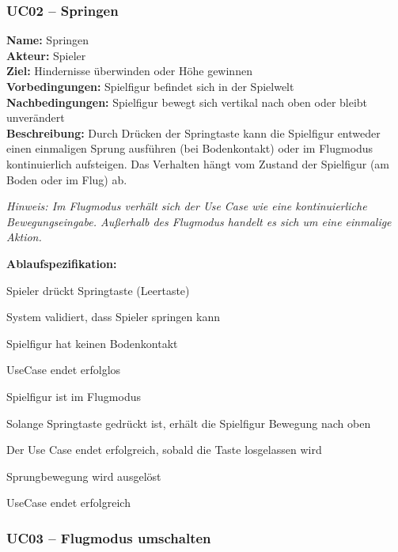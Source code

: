 \documentclass{article}
\begin{document}
\subsubsection*{UC02 – Springen}

\textbf{Name:} Springen \\
\textbf{Akteur:} Spieler \\
\textbf{Ziel:} Hindernisse überwinden oder Höhe gewinnen \\
\textbf{Vorbedingungen:} Spielfigur befindet sich in der Spielwelt \\
\textbf{Nachbedingungen:} Spielfigur bewegt sich vertikal nach oben oder bleibt unverändert \\
\textbf{Beschreibung:} Durch Drücken der Springtaste kann die Spielfigur entweder einen einmaligen Sprung ausführen (bei Bodenkontakt) oder im Flugmodus kontinuierlich aufsteigen. Das Verhalten hängt vom Zustand der Spielfigur (am Boden oder im Flug) ab.

\textit{Hinweis: Im Flugmodus verhält sich der Use Case wie eine kontinuierliche Bewegungseingabe. Außerhalb des Flugmodus handelt es sich um eine einmalige Aktion.}

\textbf{Ablaufspezifikation:}
\begin{description}[style=nextline,leftmargin=1.9cm,labelwidth=1.6cm]
  \item[1.] Spieler drückt Springtaste (Leertaste)
  \item[2.] System validiert, dass Spieler springen kann
  \item[2a.] Spielfigur hat keinen Bodenkontakt
  \item[2a.1.] UseCase endet erfolglos
  \item[2b.] Spielfigur ist im Flugmodus
  \item[2b.1.] Solange Springtaste gedrückt ist, erhält die Spielfigur Bewegung nach oben
  \item[2b.2.] Der Use Case endet erfolgreich, sobald die Taste losgelassen wird
  \item[3.] Sprungbewegung wird ausgelöst
  \item[4.] UseCase endet erfolgreich
\end{description}

\subsubsection*{UC03 – Flugmodus umschalten}
\end{document}
